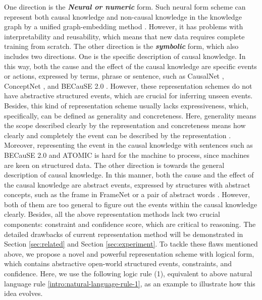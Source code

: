 One direction is the \textbf{\textit{Neural or numeric}} form. Such neural form scheme can represent both causal knowledge and non-causal knowledge in the knowledge graph by a unified graph-embedding method \cite{Li2016a,Bordes}. However, it has problems with interpretability and reusability, which means that new data requires complete training from scratch.
The other direction is the \textbf{\textit{symbolic}} form, which also includes two directions. One is the specific description of causal knowledge. In this way, both the cause and the effect of the causal knowledge are specific events or actions, expressed by terms, phrase or sentence, such as CausalNet \cite{Luo2016a}, ConceptNet \cite{Speer2016}, and BECauSE 2.0 \cite{Dunietz2017}. However, these representation schemes do not have abstractive structured events, which are crucial for inferring unseen events. Besides, this kind of representation scheme usually lacks expressiveness, which, specifically, can be defined as generality and concreteness. Here, generality means the scope described clearly by the representation \cite{oei121992meta} and concreteness means how clearly and completely the event can be described by the representation \cite{wand1993ontological}.
Moreover, representing the event in the causal knowledge with sentences such as BECauSE 2.0 and ATOMIC \cite{sap2018atomic} is hard for the machine to process, since machines are keen on structured data.
The other direction is towards the general description of causal knowledge. In this manner, both the cause and the effect of the causal knowledge are abstract events, expressed by structures with abstract concepts, such as the frame in FrameNet \cite{Baker1997} or a pair of abstract words \cite{Zhao2017}. However, both of them are too general to figure out the events within the causal knowledge clearly. 
Besides, all the above representation methods lack two crucial components: constraint and confidence score, which are critical to reasoning. The detailed drawbacks of current representation method will be demonstrated in Section \ref{sec:related} and Section \ref{sec:experiment}.  
To tackle these flaws mentioned above, we propose a novel and powerful representation scheme with logical form, which contains abstractive open-world structured events, constraints, and confidence. Here, we use the following logic rule (1), equivalent to above natural language rule \ref{intro:natural-language-rule-1}, as an example to illustrate how this idea evolves. 

